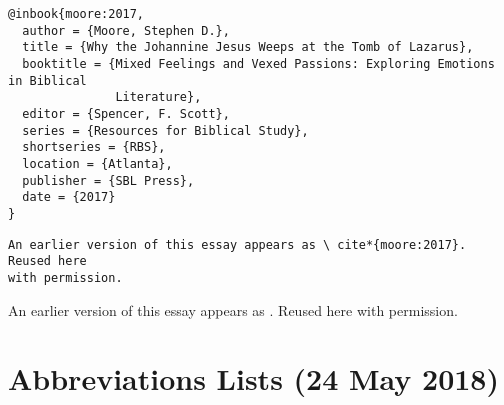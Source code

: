 \documentclass[a4paper]{article}
\begin{document}
\begin{verbatim}
@inbook{moore:2017,
  author = {Moore, Stephen D.},
  title = {Why the Johannine Jesus Weeps at the Tomb of Lazarus},
  booktitle = {Mixed Feelings and Vexed Passions: Exploring Emotions in Biblical
               Literature},
  editor = {Spencer, F. Scott},
  series = {Resources for Biblical Study},
  shortseries = {RBS},
  location = {Atlanta},
  publisher = {SBL Press},
  date = {2017}
}
\end{verbatim}

\texttt{An earlier version of this essay appears as \textbackslash
cite*\{moore:2017\}. Reused here\\ with permission.}

An earlier version of this essay appears as \cite*{moore:2017}. Reused here
with permission.

\exampleabbreviations
\examplebibliography
{}

\section{Abbreviations Lists (24 May 2018)}
\end{document}
